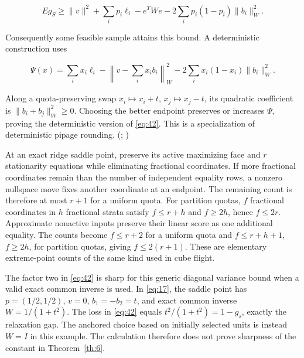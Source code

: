 \documentclass[11pt]{article}
\begin{document}
\begin{equation}\label{eq:42}
E g_S\ge \|v\|^2+\sum_i p_i\ell_i-e^TWe
-2\sum_i p_i(1-p_i)\|b_i\|_W^2. 
\end{equation}

Consequently some feasible sample attains this bound. A deterministic
construction uses

\[
\Psi(x)=\sum_i x_i\ell_i-
\left\|v-\sum_i x_ib_i\right\|_W^2
-2\sum_i x_i(1-x_i)\|b_i\|_W^2.
\]

Along a quota-preserving swap \(x_i\mapsto x_i+t\),
\(x_j\mapsto x_j-t\), its quadratic coefficient is
\(\|b_i+b_j\|_W^2\ge0\). Choosing the better endpoint preserves or
increases \(\Psi\), proving the deterministic version of \eqref{eq:42}.
This is a specialization of deterministic pipage rounding.
(\citealp{AgeevSviridenko2004};
\citealp[Theorem 7.2]{HarveyOlver2013})

At an exact ridge saddle point, preserve its active maximizing face and
\(r\) stationarity equations while eliminating fractional coordinates.
If more fractional coordinates remain than the number of independent
equality rows, a nonzero nullspace move fixes another coordinate at an
endpoint. The remaining count is therefore at most \(r+1\) for a uniform
quota. For partition quotas, \(f\) fractional coordinates in \(h\)
fractional strata satisfy \(f\le r+h\) and \(f\ge2h\), hence \(f\le2r\).
Approximate nonactive inputs preserve their linear score as one
additional equality. The counts become \(f\le r+2\) for a uniform quota
and \(f\le r+h+1\), \(f\ge2h\), for partition quotas, giving
\(f\le2(r+1)\). These are elementary extreme-point counts of the same
kind used in cube flight.

The factor two in \eqref{eq:42} is sharp for this generic diagonal
variance bound when a valid exact common inverse is used. In
\eqref{eq:17}, the saddle point has \(p=(1/2,1/2)\), \(v=0\),
\(b_1=-b_2=t\), and exact common inverse \(W=1/(1+t^2)\). The loss in
\eqref{eq:42} equals \(t^2/(1+t^2)=1-g_s\), exactly the relaxation gap.
The anchored choice based on initially selected units is instead \(W=I\)
in this example. The calculation therefore does not prove sharpness of
the constant in Theorem~\ref{th:6}.




\footnotesize



\end{document}
